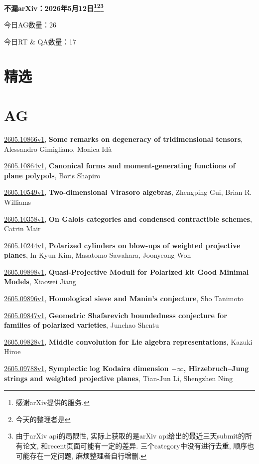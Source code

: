 \documentclass[9pt, a4paper]{article}
\theoremstyle{plain}
\theoremstyle{definition}
\theoremstyle{remark}
\newcommand{\arxiv}[3]{\href{https://arxiv.org/abs/#1}{#1}, \textbf{\textcolor{arxivblue}{#2}}, #3}
\newcommand{\AGnumber}{26}
\newcommand{\RTQAnumber}{17}
\newcommand{\NewestDate}{2026年5月12日}
\newcommand{\todayarXiver}{} %
\begin{document}
\begin{center}
    \Huge\textbf{不漏arXiv：\NewestDate\footnote{感谢arXiv提供的服务.}\footnote{今天的整理者是\todayarXiver}\footnote{由于arXiv api的局限性, 实际上获取的是arXiv api给出的最近三天submit的所有论文, 和recent页面可能有一定的差异. 三个category中没有进行去重, 顺序也可能存在一定问题, 麻烦整理者自行增删.}} \\
\end{center}

\setcounter{section}{-1}

\begin{center}
    今日AG数量：\AGnumber
    
    今日RT \& QA数量：\RTQAnumber
    
\end{center}


\section{精选}


\section{AG}
\arxiv{2605.10866v1}{Some remarks on degeneracy of tridimensional tensors}{Alessandro Gimigliano, Monica Idà}

\arxiv{2605.10864v1}{Canonical forms and moment-generating functions of plane polypols}{Boris Shapiro}

\arxiv{2605.10549v1}{Two-dimensional Virasoro algebras}{Zhengping Gui, Brian R. Williams}

\arxiv{2605.10358v1}{On Galois categories and condensed contractible schemes}{Catrin Mair}

\arxiv{2605.10244v1}{Polarized cylinders on blow-ups of weighted projective planes}{In-Kyun Kim, Masatomo Sawahara, Joonyeong Won}

\arxiv{2605.09898v1}{Quasi-Projective Moduli for Polarized klt Good Minimal Models}{Xiaowei Jiang}

\arxiv{2605.09896v1}{Homological sieve and Manin's conjecture}{Sho Tanimoto}

\arxiv{2605.09847v1}{Geometric Shafarevich boundedness conjecture for families of polarized varieties}{Junchao Shentu}

\arxiv{2605.09828v1}{Middle convolution for Lie algebra representations}{Kazuki Hiroe}

\arxiv{2605.09788v1}{Symplectic log Kodaira dimension $-\infty$, Hirzebruch--Jung strings and weighted projective planes}{Tian-Jun Li, Shengzhen Ning}
\end{document}
